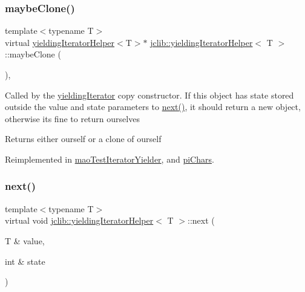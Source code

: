 \mbox{\label{classjclib_1_1yieldingIteratorHelper_ad3127265c429c4ac282964b7a3b261be}} 
\subsubsection{\texorpdfstring{maybe\+Clone()}{maybeClone()}}
{\footnotesize\ttfamily template$<$typename T$>$ \\
virtual \hyperlink{classjclib_1_1yieldingIteratorHelper}{yielding\+Iterator\+Helper}$<$T$>$$\ast$ \hyperlink{classjclib_1_1yieldingIteratorHelper}{jclib\+::yielding\+Iterator\+Helper}$<$ T $>$\+::maybe\+Clone (\begin{DoxyParamCaption}{ }\end{DoxyParamCaption})\hspace{0.3cm}{\ttfamily [inline]}, {\ttfamily [virtual]}}

Called by the \hyperlink{classjclib_1_1yieldingIterator}{yielding\+Iterator} copy constructor. If this object has state stored outside the value and state parameters to \hyperlink{classjclib_1_1yieldingIteratorHelper_a620c17e7eb8ed695e3fb9add01da576d}{next()}, it should return a new object, otherwise it\textquotesingle{}s fine to return ourselves \begin{DoxyReturn}{Returns}
either ourself or a clone of ourself 
\end{DoxyReturn}


Reimplemented in \hyperlink{classmaoTestIteratorYielder_a1ecc09d34a4b6924317eb42c7fb652ac}{mao\+Test\+Iterator\+Yielder}, and \hyperlink{classpiChars_a708b2ef6ccf87b9078ee8923f4076ee1}{pi\+Chars}.

\mbox{\label{classjclib_1_1yieldingIteratorHelper_a620c17e7eb8ed695e3fb9add01da576d}} 
\subsubsection{\texorpdfstring{next()}{next()}}
{\footnotesize\ttfamily template$<$typename T$>$ \\
virtual void \hyperlink{classjclib_1_1yieldingIteratorHelper}{jclib\+::yielding\+Iterator\+Helper}$<$ T $>$\+::next (\begin{DoxyParamCaption}\item[{T \&}]{value,  }\item[{int \&}]{state }\end{DoxyParamCaption})\hspace{0.3cm}{\ttfamily [pure virtual]}}

